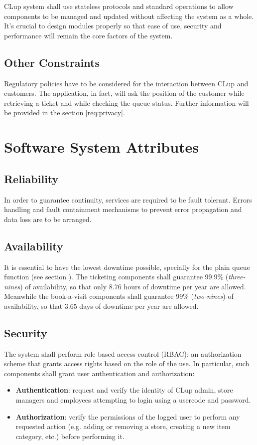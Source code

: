 CLup system shall use stateless protocols and standard operations to allow components to be managed and updated without affecting the system as a whole.\newline
It’s crucial to design modules properly so that ease of use, security and performance will remain the core factors of the system.

\subsection{Other Constraints}
Regulatory policies have to be considered for the interaction between CLup and customers. The application, in fact, will ask the position of the customer while retrieving a ticket and while checking the queue status. Further information will be provided in the section \ref{req:privacy}.

\section{Software System Attributes}

\subsection{Reliability}
In order to guarantee continuity, services are required to be fault tolerant. Errors handling and fault containment mechanisms to prevent error propagation and data loss are to be arranged.

\subsection{Availability}
It is essential to have the lowest downtime possible, specially for the plain queue function (see section ).
The ticketing components shall guarantee 99.9\% (\textit{three-nines}) of availability, so that only 8.76 hours of downtime per year are allowed.
Meanwhile the book-a-visit components shall guarantee 99\% (\textit{two-nines}) of availability, so that 3.65 days of downtime per year are allowed.

\subsection{Security}
The system shall perform role based access control (RBAC): an authorization scheme that grants access rights based on the role of the use. In particular, such components shall grant user authentication and authorization:
\begin{itemize}
    \item \textbf{Authentication}: request and verify the identity of CLup admin, store managers and employees attempting to login using a usercode and password.
    \item \textbf{Authorization}: verify the permissions of the logged user to perform any requested action (e.g. adding or removing a store, creating a new item category, etc.) before performing it.
\end{itemize}

